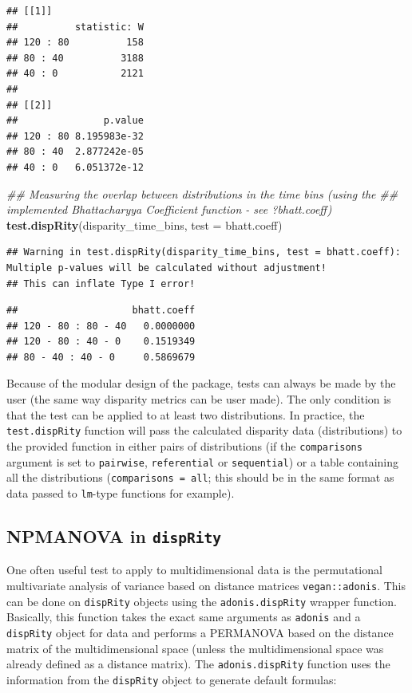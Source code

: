\documentclass[]{book}
\newenvironment{Shaded}{\begin{snugshade}}{\end{snugshade}}
\newcommand{\CommentTok}[1]{\textcolor[rgb]{0.56,0.35,0.01}{\textit{#1}}}
\newcommand{\DataTypeTok}[1]{\textcolor[rgb]{0.13,0.29,0.53}{#1}}
\newcommand{\KeywordTok}[1]{\textcolor[rgb]{0.13,0.29,0.53}{\textbf{#1}}}
\newcommand{\NormalTok}[1]{#1}
\begin{document}
\begin{verbatim}
## [[1]]
##          statistic: W
## 120 : 80          158
## 80 : 40          3188
## 40 : 0           2121
## 
## [[2]]
##               p.value
## 120 : 80 8.195983e-32
## 80 : 40  2.877242e-05
## 40 : 0   6.051372e-12
\end{verbatim}

\begin{Shaded}
\begin{Highlighting}[]
\CommentTok{## Measuring the overlap between distributions in the time bins (using the}
\CommentTok{## implemented Bhattacharyya Coefficient function - see ?bhatt.coeff)}
\KeywordTok{test.dispRity}\NormalTok{(disparity_time_bins, }\DataTypeTok{test =}\NormalTok{ bhatt.coeff)}
\end{Highlighting}
\end{Shaded}

\begin{verbatim}
## Warning in test.dispRity(disparity_time_bins, test = bhatt.coeff): Multiple p-values will be calculated without adjustment!
## This can inflate Type I error!
\end{verbatim}

\begin{verbatim}
##                    bhatt.coeff
## 120 - 80 : 80 - 40   0.0000000
## 120 - 80 : 40 - 0    0.1519349
## 80 - 40 : 40 - 0     0.5869679
\end{verbatim}

Because of the modular design of the package, tests can always be made by the user (the same way disparity metrics can be user made).
The only condition is that the test can be applied to at least two distributions.
In practice, the \texttt{test.dispRity} function will pass the calculated disparity data (distributions) to the provided function in either pairs of distributions (if the \texttt{comparisons} argument is set to \texttt{pairwise}, \texttt{referential} or \texttt{sequential}) or a table containing all the distributions (\texttt{comparisons\ =\ all}; this should be in the same format as data passed to \texttt{lm}-type functions for example).

\hypertarget{adonis}{%
\subsection{\texorpdfstring{NPMANOVA in \texttt{dispRity}}{NPMANOVA in dispRity}}\label{adonis}}

One often useful test to apply to multidimensional data is the permutational multivariate analysis of variance based on distance matrices \texttt{vegan::adonis}.
This can be done on \texttt{dispRity} objects using the \texttt{adonis.dispRity} wrapper function.
Basically, this function takes the exact same arguments as \texttt{adonis} and a \texttt{dispRity} object for data and performs a PERMANOVA based on the distance matrix of the multidimensional space (unless the multidimensional space was already defined as a distance matrix).
The \texttt{adonis.dispRity} function uses the information from the \texttt{dispRity} object to generate default formulas:
\end{document}
